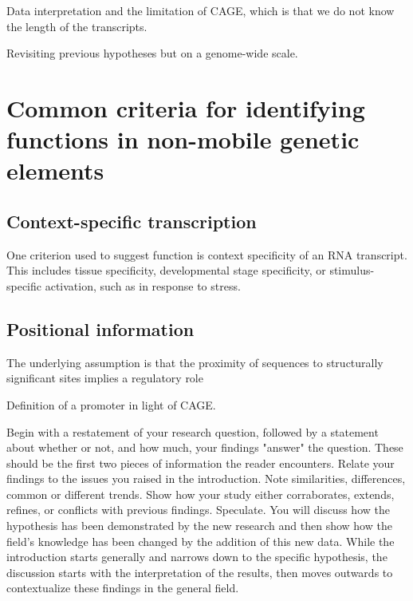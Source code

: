 Data interpretation and the limitation of CAGE, which is that we do not know the length of the transcripts.

Revisiting previous hypotheses but on a genome-wide scale.

\section{Common criteria for identifying functions in non-mobile genetic elements}

\subsection{Context-specific transcription}

One criterion used to suggest function is context specificity of an RNA transcript. This includes tissue specificity, developmental stage specificity, or stimulus-specific activation, such as in response to stress.

\subsection{Positional information}

The underlying assumption is that the proximity of sequences to structurally significant sites implies a regulatory role

Definition of a promoter in light of CAGE.

Begin with a restatement of your research question, followed by a statement about whether or not, and how much, your findings "answer" the question. These should be the first two pieces of information the reader encounters. Relate your findings to the issues you raised in the introduction. Note similarities, differences, common or different trends.  Show how your study either corraborates, extends, refines, or conflicts with previous findings. Speculate. You will discuss how the hypothesis has been demonstrated by the new research and then show how the field's knowledge has been changed by the addition of this new data. While the introduction starts generally and narrows down to the specific hypothesis, the discussion starts with the interpretation of the results, then moves outwards to contextualize these findings in the general field.

